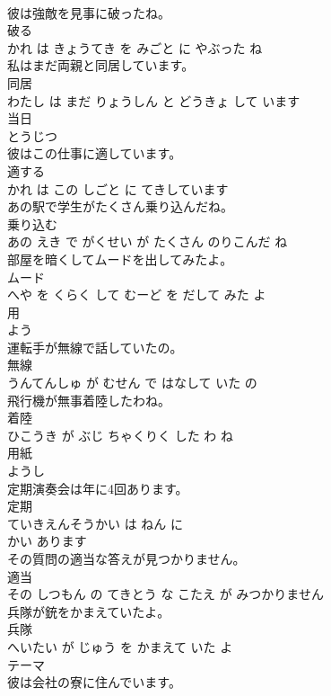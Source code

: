 \documentclass[8pt]{extreport}
\begin{document}
\begin{CJK}{UTF8}{min}
\\	彼は強敵を見事に破ったね。	
\\	破る 
\\	かれ は きょうてき を みごと に やぶった ね			
\\	私はまだ両親と同居しています。	
\\	同居 
\\	わたし は まだ りょうしん と どうきょ して います			
\\	当日	
\\	とうじつ			
\\	彼はこの仕事に適しています。	
\\	適する 
\\	かれ は この しごと に てきしています			
\\	あの駅で学生がたくさん乗り込んだね。	
\\	乗り込む 
\\	あの えき で がくせい が たくさん のりこんだ ね			
\\	部屋を暗くしてムードを出してみたよ。	
\\	ムード 
\\	へや を くらく して むーど を だして みた よ			
\\	用	
\\	よう			
\\	運転手が無線で話していたの。	
\\	無線 
\\	うんてんしゅ が むせん で はなして いた の			
\\	飛行機が無事着陸したわね。	
\\	着陸 
\\	ひこうき が ぶじ ちゃくりく した わ ね			
\\	用紙	
\\	ようし			
\\	定期演奏会は年に4回あります。	
\\	定期 
\\	ていきえんそうかい は ねん に 
\\	かい あります			
\\	その質問の適当な答えが見つかりません。	
\\	適当 
\\	その しつもん の てきとう な こたえ が みつかりません			
\\	兵隊が銃をかまえていたよ。	
\\	兵隊 
\\	へいたい が じゅう を かまえて いた よ			
\\	テーマ	
\\	彼は会社の寮に住んでいます。	

\end{CJK}
\end{document}
